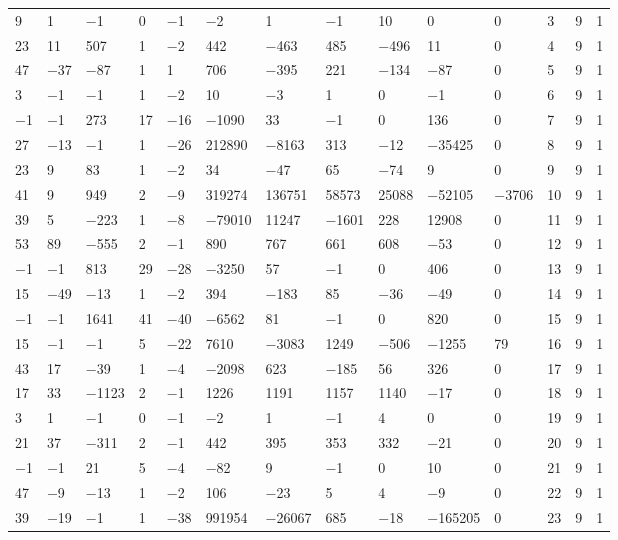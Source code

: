 \documentclass[10pt,a4paper]{amsart}
\numberwithin{equation}{section}
\theoremstyle{definition}
\numberwithin{table}{section}
\begin{document}
{\begin{paracol}{3}
\begin{supertabular}{|w{c}{.32cm}w{c}{.32cm}w{c}{.32cm}@{\hspace{.5cm}}w{c}{.2cm}w{c}{.2cm}|@{\hspace{\tabcolsep}}HHHHHHw{c}{.17cm}w{c}{.17cm}w{c}{.17cm}|}
			9 & 1 & $-$1 & 0 & $-$1 & $-$2 & 1 & $-$1 & 10 & 0 & 0 & 3 & 9 & 1 \\
			23 & 11 & 507 & 1 & $-$2 & 442 & $-$463 & 485 & $-$496 & 11 & 0 & 4 & 9 & 1 \\
			47 & $-$37 & $-$87 & 1 & 1 & 706 & $-$395 & 221 & $-$134 & $-$87 & 0 & 5 & 9 & 1 \\
			3 & $-$1 & $-$1 & 1 & $-$2 & 10 & $-$3 & 1 & 0 & $-$1 & 0 & 6 & 9 & 1 \\
			$-$1 & $-$1 & 273 & 17 & $-$16 & $-$1090 & 33 & $-$1 & 0 & 136 & 0 & 7 & 9 & 1 \\
			27 & $-$13 & $-$1 & 1 & $-$26 & 212890 & $-$8163 & 313 & $-$12 & $-$35425 & 0 & 8 & 9 & 1 \\
			23 & 9 & 83 & 1 & $-$2 & 34 & $-$47 & 65 & $-$74 & 9 & 0 & 9 & 9 & 1 \\
			41 & 9 & 949 & 2 & $-$9 & 319274 & 136751 & 58573 & 25088 & $-$52105 & $-$3706 & 10 & 9 & 1 \\
			39 & 5 & $-$223 & 1 & $-$8 & $-$79010 & 11247 & $-$1601 & 228 & 12908 & 0 & 11 & 9 & 1 \\
			53 & 89 & $-$555 & 2 & $-$1 & 890 & 767 & 661 & 608 & $-$53 & 0 & 12 & 9 & 1 \\
			$-$1 & $-$1 & 813 & 29 & $-$28 & $-$3250 & 57 & $-$1 & 0 & 406 & 0 & 13 & 9 & 1 \\
			15 & $-$49 & $-$13 & 1 & $-$2 & 394 & $-$183 & 85 & $-$36 & $-$49 & 0 & 14 & 9 & 1 \\
			$-$1 & $-$1 & 1641 & 41 & $-$40 & $-$6562 & 81 & $-$1 & 0 & 820 & 0 & 15 & 9 & 1 \\
			15 & $-$1 & $-$1 & 5 & $-$22 & 7610 & $-$3083 & 1249 & $-$506 & $-$1255 & 79 & 16 & 9 & 1 \\
			43 & 17 & $-$39 & 1 & $-$4 & $-$2098 & 623 & $-$185 & 56 & 326 & 0 & 17 & 9 & 1 \\
			17 & 33 & $-$1123 & 2 & $-$1 & 1226 & 1191 & 1157 & 1140 & $-$17 & 0 & 18 & 9 & 1 \\
			3 & 1 & $-$1 & 0 & $-$1 & $-$2 & 1 & $-$1 & 4 & 0 & 0 & 19 & 9 & 1 \\
			21 & 37 & $-$311 & 2 & $-$1 & 442 & 395 & 353 & 332 & $-$21 & 0 & 20 & 9 & 1 \\
			$-$1 & $-$1 & 21 & 5 & $-$4 & $-$82 & 9 & $-$1 & 0 & 10 & 0 & 21 & 9 & 1 \\
			47 & $-$9 & $-$13 & 1 & $-$2 & 106 & $-$23 & 5 & 4 & $-$9 & 0 & 22 & 9 & 1 \\
			39 & $-$19 & $-$1 & 1 & $-$38 & 991954 & $-$26067 & 685 & $-$18 & $-$165205 & 0 & 23 & 9 & 1 \\

\end{supertabular}
\end{paracol}}
\end{document}
